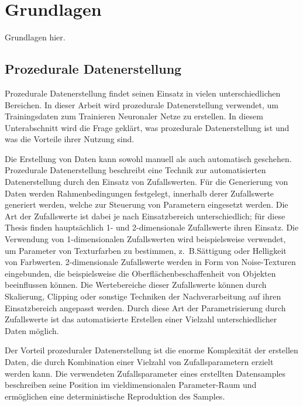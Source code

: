 
\section{Grundlagen}
\label{sec:daten:grundlagen}

Grundlagen hier.


\subsection{Prozedurale Datenerstellung}  %
\label{sec:prozedurale_datenerstellung}

Prozedurale Datenerstellung findet seinen Einsatz in vielen unterschiedlichen Bereichen. In dieser Arbeit wird prozedurale Datenerstellung verwendet, um Trainingsdaten zum Trainieren Neuronaler Netze zu erstellen. In diesem Unterabschnitt wird die Frage geklärt, was prozedurale Datenerstellung ist und was die Vorteile ihrer Nutzung sind.

Die Erstellung von Daten kann sowohl manuell als auch automatisch geschehen. Prozedurale Datenerstellung beschreibt eine Technik zur automatisierten Datenerstellung durch den Einsatz von Zufallswerten. Für die Generierung von Daten werden Rahmenbedingungen festgelegt, innerhalb derer Zufallswerte generiert werden, welche zur Steuerung von Parametern eingesetzt werden. Die Art der Zufallswerte ist dabei je nach Einsatzbereich unterschiedlich; für diese Thesis finden hauptsächlich 1- und 2-dimensionale Zufallswerte ihren Einsatz. Die Verwendung von 1-dimensionalen Zufallswerten wird beispielsweise verwendet, um Parameter von Texturfarben zu bestimmen, z.~B.Sättigung oder Helligkeit von Farbwerten. 2-dimensionale Zufallswerte werden in Form von Noise-Texturen eingebunden, die beispielsweise die Oberflächenbeschaffenheit von Objekten beeinflussen können. Die Wertebereiche dieser Zufallswerte können durch Skalierung, Clipping oder sonstige Techniken der Nachverarbeitung auf ihren Einsatzbereich angepasst werden. Durch diese Art der Parametrisierung durch Zufallswerte ist das automatisierte Erstellen einer Vielzahl unterschiedlicher Daten möglich.

Der Vorteil prozeduraler Datenerstellung ist die enorme Komplexität der erstellen Daten, die durch Kombination einer Vielzahl von Zufallsparametern erzielt werden kann. Die verwendeten Zufallsparameter eines erstellten Datensamples beschreiben seine Position im vieldimensionalen Parameter-Raum und ermöglichen eine deterministische Reproduktion des Samples.

